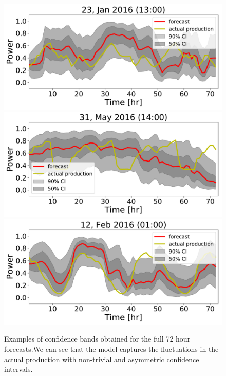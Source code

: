 \documentclass[10pt,twocolumn,letterpaper]{article}
\begin{document}
\begin{figure}[t]
\begin{center}
   \includegraphics[width=0.8\linewidth]{72hr_forecast_CI_31.pdf} %
   \includegraphics[width=0.8\linewidth]{72hr_forecast_CI_437.pdf}
   \includegraphics[width=0.8\linewidth]{72hr_forecast_CI_82.pdf}

\end{center}
   \caption{ Examples of confidence bands obtained for the full 72 hour forecasts.We can see that the model captures the fluctuations in the actual production with non-trivial and asymmetric confidence intervals.}
\label{fig:72hr}
\end{figure}
\end{document}

